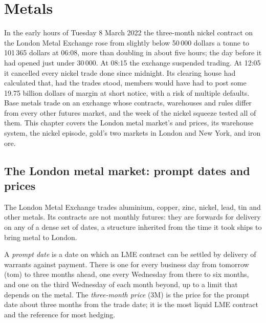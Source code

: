 \chapter{Metals}\label{ch:m3:metals}

In the early hours of Tuesday 8 March 2022 the three-month nickel contract on the London
Metal Exchange rose from slightly below 50\,000 dollars a tonne to 101\,365 dollars at
06:08, more than doubling in about five hours; the day before it had opened just under
30\,000. At 08:15 the exchange suspended trading. At 12:05 it cancelled every nickel trade
done since midnight. Its clearing house had calculated that, had the trades stood, members
would have had to post some 19.75 billion dollars of margin at short notice, with a risk of
multiple defaults. Base metals trade on an exchange whose contracts, warehouses and rules
differ from every other futures market, and the week of the nickel squeeze tested all of
them. This chapter covers the London metal market's  and prices, its warehouse
system, the nickel episode, gold's two markets in London and New York, and iron ore.

\section{The London metal market: prompt dates and prices}

The London Metal Exchange trades aluminium, copper, zinc, nickel, lead, tin and other
metals. Its contracts are not monthly futures: they are forwards for delivery on any of a
dense set of dates, a structure inherited from the time it took ships to bring metal to
London.

\begin{definition}\label{def:m3:metals:prompt}
A \emph{prompt date} is a date on which an LME contract can be settled by
delivery of warrants against payment. There is one for every business day from tomorrow
(tom) to three months ahead, one every Wednesday from there to six months, and one on the
third Wednesday of each month beyond, up to a limit that depends on the metal. The
\emph{three-month price} (3M) is the price for the prompt date about
three months from the trade date; it is the most liquid LME contract and the reference for
most hedging.
\end{definition}

